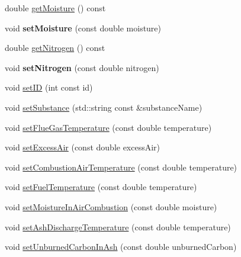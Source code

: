 \begin{DoxyCompactItemize}
\item 
double \hyperlink{class_solid_liquid_flue_gas_material_accf3c8be942d0ba244f6eabab6e7012b}{get\+Moisture} () const
\item 
\mbox{\label{class_solid_liquid_flue_gas_material_ac811fd9fee43bc497dc53c1e55c17fea}} 
void {\bfseries set\+Moisture} (const double moisture)
\item 
double \hyperlink{class_solid_liquid_flue_gas_material_a76159a5d9d609f0e0131f7bca3b60ebc}{get\+Nitrogen} () const
\item 
\mbox{\label{class_solid_liquid_flue_gas_material_a7082dd41a06397a8ae714096c091bfbe}} 
void {\bfseries set\+Nitrogen} (const double nitrogen)
\item 
void \hyperlink{class_solid_liquid_flue_gas_material_a6046d06703bd496745121b62eab4f40f}{set\+ID} (int const id)
\item 
void \hyperlink{class_solid_liquid_flue_gas_material_a54be915432c1300c4d8eaf7bf2be361f}{set\+Substance} (std\+::string const \&substance\+Name)
\item 
void \hyperlink{class_solid_liquid_flue_gas_material_ae647700dbff5ccea7938b2117f2c3156}{set\+Flue\+Gas\+Temperature} (const double temperature)
\item 
void \hyperlink{class_solid_liquid_flue_gas_material_a7a3f9f77d267afc05f5fde1da9329ec5}{set\+Excess\+Air} (const double excess\+Air)
\item 
void \hyperlink{class_solid_liquid_flue_gas_material_a626dfbc9ba87abff99e5c5a8204d69c6}{set\+Combustion\+Air\+Temperature} (const double temperature)
\item 
void \hyperlink{class_solid_liquid_flue_gas_material_a420ba1234c5f8c4b93f190b61046a589}{set\+Fuel\+Temperature} (const double temperature)
\item 
void \hyperlink{class_solid_liquid_flue_gas_material_a1a5f1bd3008e78cce62edb8aca642284}{set\+Moisture\+In\+Air\+Combustion} (const double moisture)
\item 
void \hyperlink{class_solid_liquid_flue_gas_material_ad29543a88737c3d051c7d824287bc791}{set\+Ash\+Discharge\+Temperature} (const double temperature)
\item 
void \hyperlink{class_solid_liquid_flue_gas_material_adf052dd1bdceeab710a4986b1fd874b9}{set\+Unburned\+Carbon\+In\+Ash} (const double unburned\+Carbon)
\item 

\end{DoxyCompactItemize}
